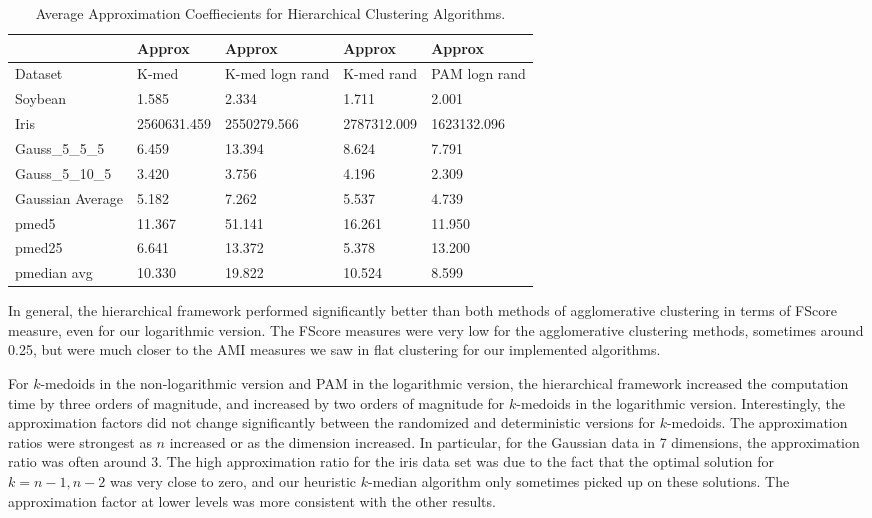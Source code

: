 \documentclass[conference, 10pt, final]{IEEEtran}
\begin{document}
\begin{table*}[!t]
\label{fig:hier_results_approx}
\caption{Average Approximation Coeffiecients for Hierarchical Clustering Algorithms.}
\centering
\begin{tabular}{ | l | l | l | l | l | }
\hline
	   & Approx & Approx & Approx & Approx \\ \hline
	Dataset & K-med & K-med logn rand & K-med rand & PAM logn rand \\ \hline
	Soybean & 1.585 & 2.334 & 1.711 & 2.001 \\ 
	Iris & 2560631.459 & 2550279.566 & 2787312.009 & 1623132.096 \\ 
	Gauss\_5\_5\_5 & 6.459 & 13.394 & 8.624 & 7.791 \\
	Gauss\_5\_10\_5 &  3.420 & 3.756 & 4.196 & 2.309  \\
	Gaussian Average & 5.182 & 7.262  & 5.537 & 4.739 \\ 
	pmed5 & 11.367 & 51.141 & 16.261 & 11.950 \\ 
	pmed25 & 6.641 & 13.372 & 5.378 & 13.200 \\ 
	pmedian avg & 10.330 & 19.822 & 10.524 & 8.599 \\ \hline
\end{tabular}
\end{table*}

In general, the hierarchical framework performed significantly better than both methods of agglomerative clustering in terms of FScore measure, even for our logarithmic version. The FScore measures were very low for the agglomerative clustering methods, sometimes around 0.25, but were much closer to the AMI measures we saw in flat clustering for our implemented algorithms. 

For $k$-medoids in the non-logarithmic version and PAM in the logarithmic version, the hierarchical framework increased the computation time by three orders of magnitude, and increased by two orders of magnitude for $k$-medoids in the logarithmic version. Interestingly, the approximation factors did not change significantly between the randomized and deterministic versions for $k$-medoids. The approximation ratios were strongest as $n$ increased or as the dimension increased. In particular, for the Gaussian data in 7 dimensions, the approximation ratio was often around 3.  The high approximation ratio for the iris data set was due to the fact that the optimal solution for $k = n-1, n-2$ was very close to zero, and our heuristic $k$-median algorithm only sometimes picked up on these solutions. The approximation factor at lower levels was more consistent with the other results. 
\end{document}
